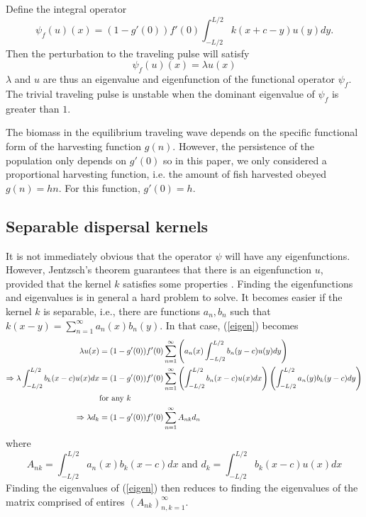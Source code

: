 \documentclass[12pt,english]{article}
\begin{document}
Define the integral operator
$$ \psi_f(u)(x)=(1-g'(0))f'(0)\int_{-L/2}^{L/2}k(x+c-y)u(y)dy. $$
Then the perturbation to the traveling pulse will satisfy 
\begin{equation} \psi_f(u)(x)=\lambda u(x) \label{eigen} \end{equation}
$\lambda$ and $u$ are thus an eigenvalue and eigenfunction of the functional operator $\psi_f$.  The trivial traveling pulse is unstable when the dominant eigenvalue of $\psi_f$ is greater than $1$.


The biomass in the equilibrium traveling wave depends on the specific functional form of the harvesting function $g(n)$.  However, the persistence of the population only depends on $g'(0)$ so in this paper, we only considered a proportional harvesting function, i.e. the amount of fish harvested obeyed $g(n)=hn$.  For this function, $g'(0)=h$.  

\subsection{Separable dispersal kernels \label{sep}}
It is not immediately obvious that the operator $\psi$ will have any eigenfunctions.  However, Jentzsch's theorem guarantees that there is an eigenfunction $u$, provided that the kernel $k$ satisfies some properties \citep{ZhouKot2011}.  Finding the eigenfunctions and eigenvalues is in general a hard problem to solve.  It becomes easier if the kernel $k$ is separable, i.e., there are functions $a_n,b_n$ such that $k(x-y)=\sum_{n=1}^\infty a_n(x)b_n(y)$.  In that case, (\ref{eigen}) becomes
\begin{align}
\lambda u(x)&=(1-g'(0))f'(0)\sum_{n=1}^\infty\left( a_n(x)\int_{-L/2}^{L/2}b_n(y-c)u(y)dy\right) \notag
\\ \Rightarrow \lambda\int_{-L/2}^{L/2}b_k(x-c)u(x)dx&=(1-g'(0))f'(0)\sum_{n=1}^{\infty}\left(\int_{-L/2}^{L/2}b_n(x-c)u(x)dx\right)\left(\int_{-L/2}^{L/2}a_n(y)b_k(y-c)dy\right) \notag
\\& \text{for any $k$} \notag
\\ \Rightarrow \lambda d_k&=(1-g'(0))f'(0)\sum_{n=1}^\infty A_{nk}d_n  \label{problem}
\end{align}
where
\begin{equation*}
A_{nk}=\int_{-L/2}^{L/2}a_n(x)b_k(x-c)dx \text{ and } d_k=\int_{-L/2}^{L/2}b_k(x-c)u(x)dx
\end{equation*}
Finding the eigenvalues of (\ref{eigen}) then reduces to finding the eigenvalues of the matrix comprised of entires $(A_{nk})_{n,k=1}^\infty$.
\end{document}
